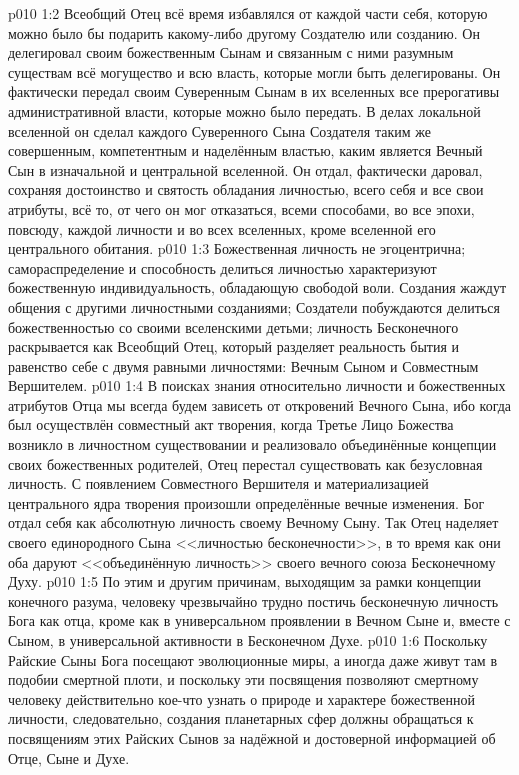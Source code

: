 \vs p010 1:2 Всеобщий Отец всё время избавлялся от каждой части себя, которую можно было бы подарить какому\hyp{}либо другому Создателю или созданию. Он делегировал своим божественным Сынам и связанным с ними разумным существам всё могущество и всю власть, которые могли быть делегированы. Он фактически передал своим Суверенным Сынам в их вселенных все прерогативы административной власти, которые можно было передать. В делах локальной вселенной он сделал каждого Суверенного Сына Создателя таким же совершенным, компетентным и наделённым властью, каким является Вечный Сын в изначальной и центральной вселенной. Он отдал, фактически даровал, сохраняя достоинство и святость обладания личностью, всего себя и все свои атрибуты, всё то, от чего он мог отказаться, всеми способами, во все эпохи, повсюду, каждой личности и во всех вселенных, кроме вселенной его центрального обитания.
\vs p010 1:3 \pc Божественная личность не эгоцентрична; самораспределение и способность делиться личностью характеризуют божественную индивидуальность, обладающую свободой воли. Создания жаждут общения с другими личностными созданиями; Создатели побуждаются делиться божественностью со своими вселенскими детьми; личность Бесконечного раскрывается как Всеобщий Отец, который разделяет реальность бытия и равенство себе с двумя равными личностями: Вечным Сыном и Совместным Вершителем.
\vs p010 1:4 \pc В поисках знания относительно личности и божественных атрибутов Отца мы всегда будем зависеть от откровений Вечного Сына, ибо когда был осуществлён совместный акт творения, когда Третье Лицо Божества возникло в личностном существовании и реализовало объединённые концепции своих божественных родителей, Отец перестал существовать как безусловная личность. С появлением Совместного Вершителя и материализацией центрального ядра творения произошли определённые вечные изменения. Бог отдал себя как абсолютную личность своему Вечному Сыну. Так Отец наделяет своего единородного Сына <<личностью бесконечности>>, в то время как они оба даруют <<объединённую личность>> своего вечного союза Бесконечному Духу.
\vs p010 1:5 По этим и другим причинам, выходящим за рамки концепции конечного разума, человеку чрезвычайно трудно постичь бесконечную личность Бога как отца, кроме как в универсальном проявлении в Вечном Сыне и, вместе с Сыном, в универсальной активности в Бесконечном Духе.
\vs p010 1:6 Поскольку Райские Сыны Бога посещают эволюционные миры, а иногда даже живут там в подобии смертной плоти, и поскольку эти посвящения позволяют смертному человеку действительно кое\hyp{}что узнать о природе и характере божественной личности, следовательно, создания планетарных сфер должны обращаться к посвящениям этих Райских Сынов за надёжной и достоверной информацией об Отце, Сыне и Духе.
